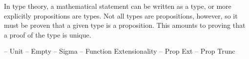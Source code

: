\documentclass[ProjectReport]{subfiles}
\begin{document}
In type theory, a mathematical statement can be written as a type, or more explicitly propositions are types. Not all types are propositions, however, so it must be proven that a given type is a proposition. This amounts to proving that a proof of the type is unique. 

-- Unit
-- Empty
-- Sigma
-- Function Extensionality
-- Prop Ext
-- Prop Trunc

\begin{comment}
When building a library, certainly many of the initial proofs may be auto-solved by Agda, but in my experience asking Agda to look for a proof results in an indefinite hang due to the size of the terms I am working with. If Agda compiles the code, then I can sure that the proofs I am writing is correct up to the interpretation of the types I write, but I cannot rely on Agda to auto-generate proofs for me.
\end{comment}
\end{document}
